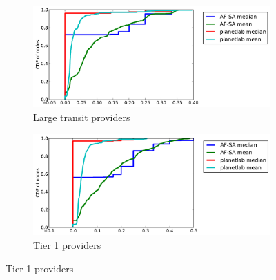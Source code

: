 \documentclass{sig-alternate-10pt}
\begin{document}
\begin{figure}
\centering
\begin{subfigure}[b]{0.45\textwidth}
\centering
    \includegraphics[width=1.0\linewidth]{figs/fractions_of_types-ltp.pdf}
    \caption{Large transit providers}
\label{fig:as_ltp}
\end{subfigure}
\begin{subfigure}[b]{0.45\textwidth}
\centering
    \includegraphics[width=1.0\linewidth]{figs/fractions_of_types-tier1.pdf}
    \caption{Tier 1 providers}
\label{fig:as_tier1}
\end{subfigure}


\end{figure}
\end{document}
